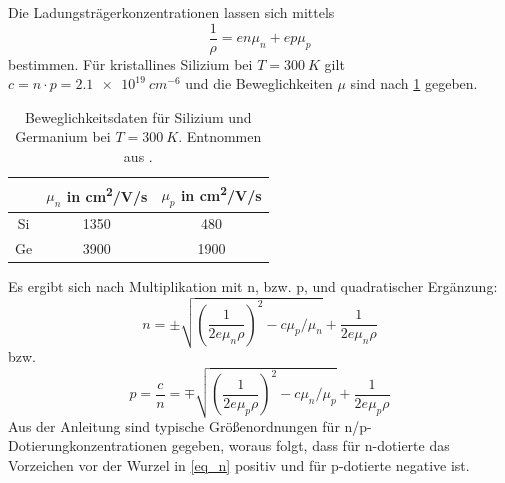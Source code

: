\documentclass[
	a4paper,
	12pt,
	pagesize,
	ngerman
]{scrartcl}
\begin{document}
	Die Ladungsträgerkonzentrationen lassen sich mittels
	\begin{equation}
			\frac{1}{\rho}=en\mu_n + ep\mu_p
	\end{equation}
	bestimmen.
	Für kristallines Silizium bei $T=\SI{300}{K}$ gilt $c=n\cdot p=\SI{2.1e19}{cm^{-6}}$ und die Beweglichkeiten $\mu$ sind nach \cref{tb_beweg} gegeben.


	\begin{table}[H]
		\centering
		\begin{tabular}{c | c | c  }
			 &$\mu_n$ in \si{cm^2/V/s}&$\mu_p$ in \si{cm^2/V/s}\\ \hline
			 Si&1350&480 \\
			 Ge&3900&1900 \\
		\end{tabular}
		\caption{
		Beweglichkeitsdaten für Silizium und Germanium bei $T=\SI{300}{K}$. Entnommen aus \cite{anleitung}. %
		}
		\label{tb_beweg}
	\end{table}

	Es ergibt sich nach Multiplikation mit n, bzw. p, und quadratischer Ergänzung:
	\begin{equation}
		\label{eq_n}
			n =  \pm\sqrt{\left(\frac{1}{2e\mu_n\rho}\right)^2-c\mu_p/\mu_n}+\frac{1}{2e\mu_n \rho} %
	\end{equation}
	bzw.
	\begin{equation}
			\label{eq_p}
			p =\frac{c}{n}=  \mp\sqrt{\left(\frac{1}{2e\mu_p\rho}\right)^2-c\mu_n/\mu_p}+\frac{1}{2e\mu_p \rho} %
	\end{equation}
	Aus der Anleitung sind typische Größenordnungen für n/p-Dotierungkonzentrationen gegeben, woraus folgt, dass für n-dotierte das Vorzeichen vor der Wurzel in \cref{eq_n} positiv und für p-dotierte negative ist.
\end{document}
